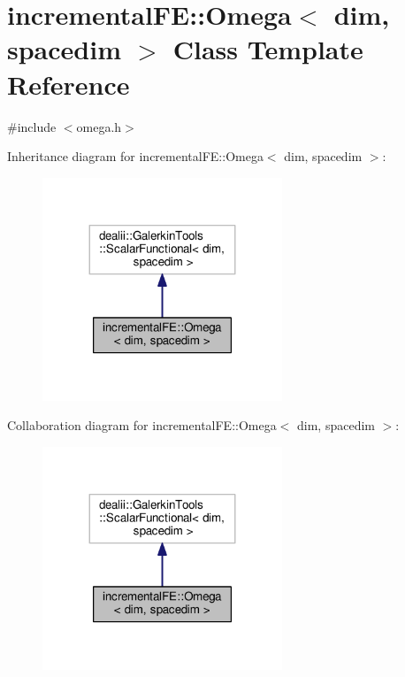 \hypertarget{classincremental_f_e_1_1_omega}{}\section{incremental\+FE\+:\+:Omega$<$ dim, spacedim $>$ Class Template Reference}
\label{classincremental_f_e_1_1_omega}


{\ttfamily \#include $<$omega.\+h$>$}



Inheritance diagram for incremental\+FE\+:\+:Omega$<$ dim, spacedim $>$\+:\nopagebreak
\begin{figure}[H]
\begin{center}
\leavevmode
\includegraphics[width=203pt]{classincremental_f_e_1_1_omega__inherit__graph}
\end{center}
\end{figure}


Collaboration diagram for incremental\+FE\+:\+:Omega$<$ dim, spacedim $>$\+:\nopagebreak
\begin{figure}[H]
\begin{center}
\leavevmode
\includegraphics[width=203pt]{classincremental_f_e_1_1_omega__coll__graph}
\end{center}
\end{figure}
